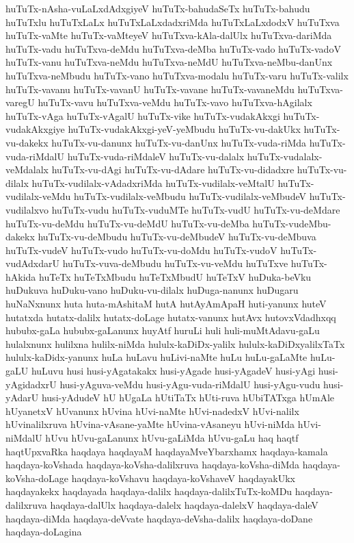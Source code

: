 {huTuTx-nAsha-vuLaLxdAdxgiyeV
huTuTx-bahudaSeTx
huTuTx-bahudu
huTuTxlu
huTuTxLaLx
huTuTxLaLxdadxriMda
huTuTxLaLxdodxV
huTuTxva
huTuTx-vaMte
huTuTx-vaMteyeV
huTuTxva-kAla-dalUlx
huTuTxva-dariMda
huTuTx-vadu
huTuTxva-deMdu
huTuTxva-deMba
huTuTx-vado
huTuTx-vadoV
huTuTx-vanu
huTuTxva-neMdu
huTuTxva-neMdU
huTuTxva-neMbu-danUnx
huTuTxva-neMbudu
huTuTx-vano
huTuTxva-modalu
huTuTx-varu
huTuTx-valilx
huTuTx-vavanu
huTuTx-vavanU
huTuTx-vavane
huTuTx-vavaneMdu
huTuTxva-varegU
huTuTx-vavu
huTuTxva-veMdu
huTuTx-vavo
huTuTxva-hAgilalx
huTuTx-vAga
huTuTx-vAgalU
huTuTx-vike
huTuTx-vudakAkxgi
huTuTx-vudakAkxgiye
huTuTx-vudakAkxgi-yeV-yeMbudu
huTuTx-vu-dakUkx
huTuTx-vu-dakekx
huTuTx-vu-danunx
huTuTx-vu-danUnx
huTuTx-vuda-riMda
huTuTx-vuda-riMdalU
huTuTx-vuda-riMdaleV
huTuTx-vu-dalalx
huTuTx-vudalalx-veMdalalx
huTuTx-vu-dAgi
huTuTx-vu-dAdare
huTuTx-vu-didadxre
huTuTx-vu-dilalx
huTuTx-vudilalx-vAdadxriMda
huTuTx-vudilalx-veMtalU
huTuTx-vudilalx-veMdu
huTuTx-vudilalx-veMbudu
huTuTx-vudilalx-veMbudeV
huTuTx-vudilalxvo
huTuTx-vudu
huTuTx-vuduMTe
huTuTx-vudU
huTuTx-vu-deMdare
huTuTx-vu-deMdu
huTuTx-vu-deMdU
huTuTx-vu-deMba
huTuTx-vudeMbu-dakekx
huTuTx-vu-deMbudu
huTuTx-vu-deMbudeV
huTuTx-vu-deMbuva
huTuTx-vudeV
huTuTx-vudo
huTuTx-vu-doMdu
huTuTx-vudoV
huTuTx-vudAdxdarU
huTuTx-vuva-deMbudu
huTuTx-vu-veMdu
huTuTxve
huTuTx-hAkida
huTeTx
huTeTxMbudu
huTeTxMbudU
huTeTxV
huDuka-beVku
huDukuva
huDuku-vano
huDuku-vu-dilalx
huDuga-nanunx
huDugaru
huNaNxnunx
huta
huta-mAshitaM
hutA
hutAyAmApaH
huti-yanunx
huteV
hutatxda
hutatx-dalilx
hutatx-doLage
hutatx-vanunx
hutAvx
hutovxVdadhxqq
hububx-gaLa
hububx-gaLanunx
huyAtf
huruLi
huli
huli-muMtAdavu-gaLu
hulalxnunx
hulilxna
hulilx-niMda
hululx-kaDiDx-yalilx
hululx-kaDiDxyalilxTaTx
hululx-kaDidx-yanunx
huLa
huLavu
huLivi-naMte
huLu
huLu-gaLaMte
huLu-gaLU
huLuvu
husi
husi-yAgatakakx
husi-yAgade
husi-yAgadeV
husi-yAgi
husi-yAgidadxrU
husi-yAguva-veMdu
husi-yAgu-vuda-riMdalU
husi-yAgu-vudu
husi-yAdarU
husi-yAdudeV
hU
hUgaLa
hUtiTaTx
hUti-ruva
hUbiTATxga
hUmAle
hUyanetxV
hUvanunx
hUvina
hUvi-naMte
hUvi-nadedxV
hUvi-nalilx
hUvinalilxruva
hUvina-vAsane-yaMte
hUvina-vAsaneyu
hUvi-niMda
hUvi-niMdalU
hUvu
hUvu-gaLanunx
hUvu-gaLiMda
hUvu-gaLu
haq
haqtf
haqtUpxvaRka
haqdaya
haqdayaM
haqdayaMveYbarxhamx
haqdaya-kamala
haqdaya-koVshada
haqdaya-koVsha-dalilxruva
haqdaya-koVsha-diMda
haqdaya-koVsha-doLage
haqdaya-koVshavu
haqdaya-koVshaveV
haqdayakUkx
haqdayakekx
haqdayada
haqdaya-dalilx
haqdaya-dalilxTuTx-koMDu
haqdaya-dalilxruva
haqdaya-dalUlx
haqdaya-dalelx
haqdaya-dalelxV
haqdaya-daleV
haqdaya-diMda
haqdaya-deVvate
haqdaya-deVsha-dalilx
haqdaya-doDane
haqdaya-doLagina
}
